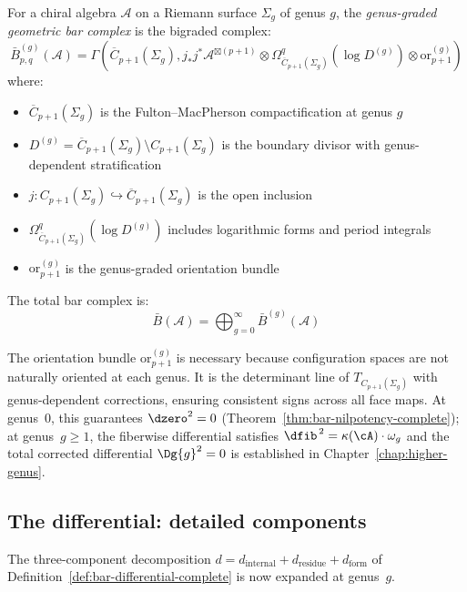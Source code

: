 \begin{definition}\label{def:geom-bar}
For a chiral algebra $\mathcal{A}$ on a Riemann surface $\Sigma_g$ of genus $g$, the \emph{genus-graded geometric bar complex} is the bigraded complex:
\[
\bar{B}^{(g)}_{p,q}(\mathcal{A}) = \Gamma\left(\overline{C}_{p+1}(\Sigma_g), j_*j^*\mathcal{A}^{\boxtimes(p+1)} \otimes \Omega^q_{\overline{C}_{p+1}(\Sigma_g)}(\log D^{(g)}) \otimes \text{or}_{p+1}^{(g)}\right)
\]
where:
\begin{itemize}
\item $\overline{C}_{p+1}(\Sigma_g)$ is the Fulton--MacPherson compactification at genus $g$
\item $D^{(g)} = \overline{C}_{p+1}(\Sigma_g) \setminus C_{p+1}(\Sigma_g)$ is the boundary divisor with genus-dependent stratification
\item $j: C_{p+1}(\Sigma_g) \hookrightarrow \overline{C}_{p+1}(\Sigma_g)$ is the open inclusion
\item $\Omega^q_{\overline{C}_{p+1}(\Sigma_g)}(\log D^{(g)})$ includes logarithmic forms and period integrals
\item $\text{or}_{p+1}^{(g)}$ is the genus-graded orientation bundle
\end{itemize}

The total bar complex is:
\[\bar{B}(\mathcal{A}) = \bigoplus_{g=0}^{\infty} \bar{B}^{(g)}(\mathcal{A})\]
\end{definition}

\begin{remark}
The orientation bundle $\text{or}_{p+1}^{(g)}$ is necessary because configuration spaces are not naturally
oriented at each genus. It is the determinant line of $T_{C_{p+1}(\Sigma_g)}$ with genus-dependent corrections, ensuring consistent signs across all face maps. At genus~$0$, this guarantees $\dzero^2 = 0$ (Theorem~\ref{thm:bar-nilpotency-complete}); at genus~$g \geq 1$, the fiberwise differential satisfies $\dfib^{\,2} = \kappa(\cA)\cdot\omega_g$ and the total corrected differential $\Dg{g}^2 = 0$ is established in Chapter~\ref{chap:higher-genus}.
\end{remark}

\subsection{The differential: detailed components}

The three-component decomposition $d = d_{\text{internal}} + d_{\text{residue}} + d_{\text{form}}$
of Definition~\ref{def:bar-differential-complete} is now expanded at genus~$g$.

